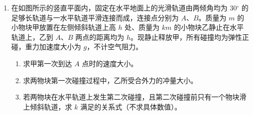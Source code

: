 \documentclass[\gkver]{gaokaozhenti}
\begin{document}
\begin{enumerate}
{因此粒子两次在磁场中的运动轨迹关于 $y$ 轴对称，如图所示。


则粒子第二次出磁场的坐标，即为粒子第一次进入磁场的坐标 $(0, -r)$。
}


\item
在如图所示的竖直平面内，固定在水平地面上的光滑轨道由两倾角均为 $ 30 {^\circ} $ 的足够长轨道与一水平轨道平滑连接而成，连接点分别为 $ A $、$ B $。质量为 $ m $ 的小物块甲放置在左侧倾斜轨道上高 $ h $ 处、质量为 $ km $ 的小物块乙静止在水平轨道上，乙到 $ A $、$ B $ 两点的距离均为 $ h $。现静止释放甲，所有碰撞均为弹性正碰，重力加速度大小为 $ g $，不计空气阻力。
\begin{enumerate}
	\item 
	求甲第一次到达 $ A $ 点时的速度大小。
	
	\item
	求两物块第一次碰撞过程中，乙所受合外力的冲量大小。
	
	\item
	若两物块在水平轨道上发生第二次碰撞，且第二次碰撞前只有一个物块滑上倾斜轨道，求 $ k $ 满足的关系式（不求具体数值）。
\end{enumerate}
\onepicture[w=15.11cm, h=4.01cm, align=right]{}
\end{enumerate}
\end{document}
